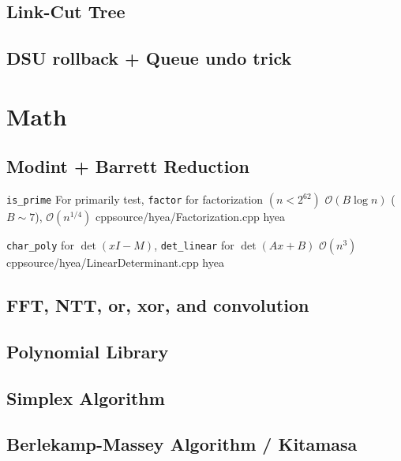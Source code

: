 \documentclass[portrait, 8pt, a4paper, oneside, twocolumn]{extarticle}
\begin{document}
\added

\subsection{Link-Cut Tree}

\added

\subsection{DSU rollback + Queue undo trick}



\section{Math}

\tested

\subsection{Modint + Barrett Reduction}

\added

{\texttt{is\_prime} For primarily test, \texttt{factor} for factorization $(n < 2^{62})$}
{$\mathcal{O}(B\log n)$ ($B \sim 7$), $\mathcal{O}({n}^{1/4})$}
{cpp}{source/hyea/Factorization.cpp}
{hyea}

{\texttt{char\_poly} for $\det(xI-M)$, \texttt{det\_linear} for $\det(Ax+B)$}
{$\mathcal{O}(n^3)$}
{cpp}{source/hyea/LinearDeterminant.cpp}
{hyea}

\subsection{FFT, NTT, or, xor, and convolution}

\added

\subsection{Polynomial Library}

\added

\subsection{Simplex Algorithm}

\added

\subsection{Berlekamp-Massey Algorithm / Kitamasa}
\end{document}
